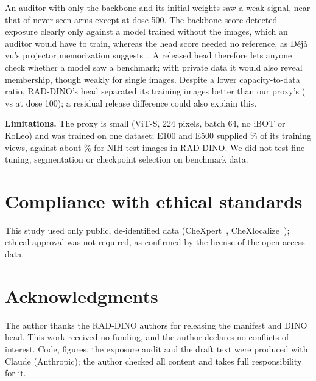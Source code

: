 \documentclass{article}
\begin{document}
An auditor with only the backbone and its initial weights saw a weak signal, near that of never-seen arms except at dose 500. The backbone score detected exposure clearly only against a model trained without the images, which an auditor would have to train, whereas the head score needed no reference, as D\'ej\`a vu's projector memorization suggests~\cite{meehan2023dejavu}. A released head therefore lets anyone check whether a model saw a benchmark; with private data it would also reveal membership, though weakly for single images. Despite a lower capacity-to-data ratio, RAD-DINO's head separated its training images better than our proxy's (\RadHead{} vs \HeadHundred{} at dose 100); a residual release difference could also explain this.

\textbf{Limitations.} The proxy is small (ViT-S, 224 pixels, batch 64, no iBOT or KoLeo) and was trained on one dataset; E100 and E500 supplied \ViewShareHigh\% of its training views, against about \RadNIHShare\% for NIH test images in RAD-DINO. We did not test fine-tuning, segmentation or checkpoint selection on benchmark data.

\section{Compliance with ethical standards}
This study used only public, de-identified data (CheXpert~\cite{irvin2019chexpert}, CheXlocalize~\cite{saporta2022chexlocalize}); ethical approval was not required, as confirmed by the license of the open-access data.

\section{Acknowledgments}
The author thanks the RAD-DINO authors for releasing the manifest and DINO head. This work received no funding, and the author declares no conflicts of interest. Code, figures, the exposure audit and the draft text were produced with Claude (Anthropic); the author checked all content and takes full responsibility for it.


{\scriptsize}
\end{document}
